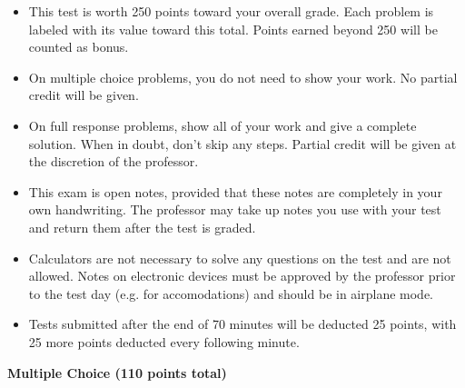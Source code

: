 \documentclass[12pt]{exam}
\newcommand{\<}{\langle}
\renewcommand{\>}{\rangle}
\begin{document}
\begin{center}
\end{center}
\vspace{0.1in}

\vspace{12pt}

\begin{itemize}
  \item This test is worth 250 points toward your overall grade.
        Each problem is labeled with its value toward this total. Points
        earned beyond 250 will be counted as bonus.
  \item On multiple choice problems, you do not need to show your work. No
        partial credit will be given.
  \item On full response problems, show all of your work and give a
        complete solution. When in doubt, don't skip any steps. Partial
        credit will be given at the discretion of the professor.
  \item This exam is open notes, provided that these notes are completely
        in your own handwriting. The professor may take up notes you use
        with your test and return them after the test is graded.
  \item Calculators are not necessary to solve any questions on the test and
        are not allowed.
        Notes on electronic devices must be approved by the professor
        prior to the test day (e.g. for accomodations) and should be in
        airplane mode.
  \item Tests submitted after the end of 70 minutes will be deducted 25 points,
        with 25 more points deducted every following minute.
\end{itemize}

\newpage

\begin{center}
  \textbf{Multiple Choice (110 points total)}
\end{center}
\end{document}
